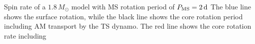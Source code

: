 \label{fig:MRI1.8rot} Spin rate of a $1.8 \, M_\odot$ model with MS rotation period of $P_{\rm MS} = 2 \, {\rm d}$ The blue line shows the surface rotation, while the black line shows the core rotation period including AM transport by the TS dynamo. The red line shows the core rotation rate including